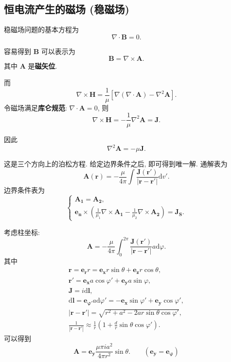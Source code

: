 \subsection{恒电流产生的磁场 (稳磁场)}
稳磁场问题的基本方程为
\begin{equation}
    \nabla\cdot\bm{B}=0.
\end{equation}

容易得到 $\bm{B}$ 可以表示为
\begin{equation}
    \bm{B}=\nabla\times\bm{A}.
\end{equation}
其中 $\bm{A}$ 是\textbf{磁矢位}.

而
\begin{equation}
    \nabla\times\bm{H}=\frac{1}{\mu}[\nabla(\nabla\cdot\bm{A})-\nabla^2\bm{A}].
\end{equation}
令磁场满足\textbf{库仑规范}: $\nabla\cdot\bm{A}=0$, 则
\begin{equation}
    \nabla\times\bm{H}=-\frac{1}{\mu}\nabla^2\bm{A}=\bm{J}.
\end{equation}

因此
\begin{equation}
    \nabla^2\bm{A}=-\mu\bm{J}.
\end{equation}

这是三个方向上的泊松方程. 给定边界条件之后, 即可得到唯一解. 通解表为
\begin{equation}
    \bm{A}(\bm{r})=-\frac{\mu}{4\pi}\int\frac{\bm{J}(\bm{r'})}{|\bm{r}-\bm{r'}|}\mathrm{d}v'.
\end{equation}
边界条件表为
\begin{equation}
    \begin{cases}
        \bm{A_1}=\bm{A_2}, \\
        \bm{e_n}\times\left(\frac{1}{\mu_1}\nabla\times\bm{A_1}-\frac{1}{\mu_2}\nabla\times\bm{A_2}\right)=\bm{J_S}.
    \end{cases}
\end{equation}

考虑柱坐标:
\begin{equation}
    \bm{A}=-\frac{\mu}{4\pi}\int_{0}^{2\pi}\frac{\bm{J}(\bm{r'})}{|\bm{r}-\bm{r'}|}a\mathrm{d}\varphi.
\end{equation}
其中
\begin{gather*}
    \bm{r}=\bm{e_r}r=\bm{e_x}r\sin\theta+\bm{e_z}r\cos\theta, \\
    \bm{r'}=\bm{e_x}a\cos\varphi'+\bm{e_y}a\sin\varphi, \\
    \bm{J}=i\mathrm{d}\bm{l}, \\
    \mathrm{d}\bm{l}=\bm{e_{\varphi'}}a\mathrm{d}\varphi'=-\bm{e_x}\sin\varphi'+\bm{e_y}\cos\varphi', \\
    |\bm{r}-\bm{r'}|=\sqrt{r^2+a^2-2ar\sin\theta\cos\varphi'}, \\
    \frac{1}{|\bm{r}-\bm{r'}|}\approx\frac{1}{r}\left(1+\frac{d}{r}\sin\theta\cos\varphi'\right).
\end{gather*}
可以得到
\begin{equation}
    \bm{A}=\bm{e_y}\frac{\mu\pi ia^2}{4\pi r^2}\sin\theta. \qquad (\bm{e_y}=\bm{e_\varphi})
\end{equation}
